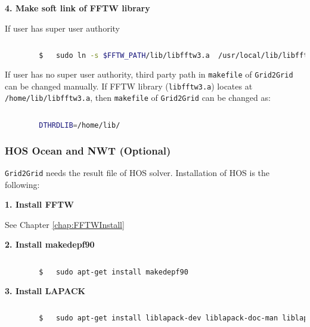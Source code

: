		
		\vspace{0.5cm}
		\textbf{4. Make soft link of FFTW library }
		
		If user has super user authority
		
		\begin{lstlisting}[language=bash]
		
		$	sudo ln -s $FFTW_PATH/lib/libfftw3.a  /usr/local/lib/libfftw3.a		
		\end{lstlisting}
				
		\vspace{0.5cm}
		
		If user has no super user authority, third party path in \texttt{makefile} of \texttt{Grid2Grid} can be changed manually. If FFTW library (\texttt{libfftw3.a}) locates at \texttt{/home/lib/libfftw3.a}, then \texttt{makefile} of \texttt{Grid2Grid} can be changed as: 
		
		
		\begin{lstlisting}[language=bash]
		
		DTHRDLIB=/home/lib/
		\end{lstlisting}
		
		
		\pagebreak
		\subsubsection{HOS Ocean and NWT (Optional)}
		
		\texttt{Grid2Grid} needs the result file of HOS solver. Installation of HOS is the following: 
		
		\vspace{0.2cm}
		\textbf{1. Install FFTW}
		
		See Chapter \ref{chap:FFTWInstall}
		
		\vspace{0.2cm}
		\textbf{2. Install makedepf90}
		
		\begin{lstlisting}[language=bash]		
		
		$	sudo apt-get install makedepf90		
		\end{lstlisting}
		
		\vspace{0.2cm}
		\textbf{3. Install LAPACK}
		
		\begin{lstlisting}[language=bash]
		
		$	sudo apt-get install liblapack-dev liblapack-doc-man liblapack-doc liblapack-pic liblapack3 liblapack-test liblapack3gf liblapacke liblapacke-dev
		\end{lstlisting}
		
